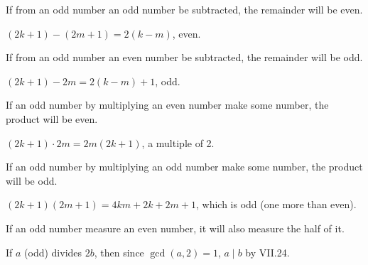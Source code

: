 \begin{claim}
\label{prop:IX.26}
If from an odd number an odd number be subtracted, the remainder will
be even.
\end{claim}
\begin{evidence}[Proof of IX.26]
\label{ev:IX.26}
$(2k+1) - (2m+1) = 2(k-m)$, even.
\end{evidence}

\begin{claim}
\label{prop:IX.27}
If from an odd number an even number be subtracted, the remainder
will be odd.
\end{claim}
\begin{evidence}[Proof of IX.27]
\label{ev:IX.27}
$(2k+1) - 2m = 2(k-m) + 1$, odd.
\end{evidence}

\begin{claim}
\label{prop:IX.28}
If an odd number by multiplying an even number make some number, the
product will be even.
\end{claim}
\begin{evidence}[Proof of IX.28]
\label{ev:IX.28}
$(2k+1) \cdot 2m = 2 m(2k+1)$, a multiple of 2.
\end{evidence}

\begin{claim}
\label{prop:IX.29}
If an odd number by multiplying an odd number make some number, the
product will be odd.
\end{claim}
\begin{evidence}[Proof of IX.29]
\label{ev:IX.29}
$(2k+1)(2m+1) = 4km + 2k + 2m + 1$, which is odd (one more than even).
\end{evidence}

\begin{claim}
\label{prop:IX.30}
If an odd number measure an even number, it will also measure the
half of it.
\end{claim}
\begin{evidence}[Proof of IX.30]
\label{ev:IX.30}
If $a$ (odd) divides $2b$, then since $\gcd(a, 2) = 1$, $a \mid b$
by VII.24.
\end{evidence}

